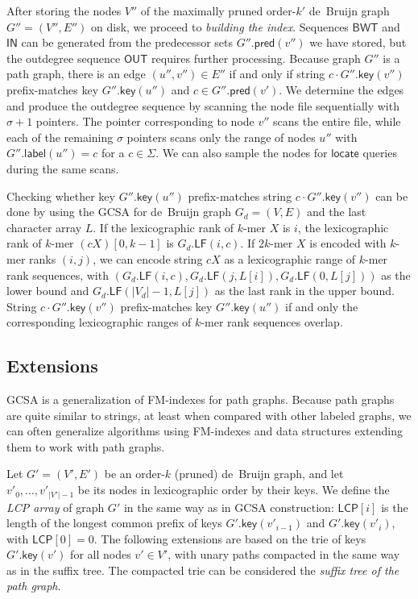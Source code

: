 \documentclass[a4paper,UKenglish]{lipics-v2016}
\newcommand{\abs}[1]{\ensuremath{\lvert #1 \rvert}}
\newcommand{\LF}{\ensuremath{\mathsf{LF}}}
\newcommand{\locate}{\ensuremath{\mathsf{locate}}}
\newcommand{\glabel}{\ensuremath{\mathsf{label}}}
\newcommand{\gpred}{\ensuremath{\mathsf{pred}}}
\newcommand{\gkey}{\ensuremath{\mathsf{key}}}
\newcommand{\kmer}[1]{$#1$\nobreakdash-mer}
\newcommand{\orderk}[1]{order\nobreakdash-$#1$}
\newcommand{\BWT}{\ensuremath{\mathsf{BWT}}}
\newcommand{\LCP}{\ensuremath{\mathsf{LCP}}}
\newcommand{\bvIN}{\ensuremath{\mathsf{IN}}}
\newcommand{\bvOUT}{\ensuremath{\mathsf{OUT}}}
\begin{document}
After storing the nodes $V''$ of the maximally pruned \orderk{k'} de~Bruijn graph $G'' = (V'', E'')$ on disk, we proceed to \emph{building the index}. Sequences $\BWT$ and $\bvIN$ can be generated from the predecessor sets $G''.\gpred(v'')$ we have stored, but the outdegree sequence $\bvOUT$ requires further processing. Because graph $G''$ is a path graph, there is an edge $(u'', v'') \in E''$ if and only if string $c \cdot G''.\gkey(v'')$ prefix-matches key $G''.\gkey(u'')$ and $c \in G''.\gpred(v')$. We determine the edges and produce the outdegree sequence by scanning the node file sequentially with $\sigma+1$ pointers. The pointer corresponding to node $v''$ scans the entire file, while each of the remaining $\sigma$ pointers scans only the range of nodes $u''$ with $G''.\glabel(u'') = c$ for a $c \in \Sigma$. We can also sample the nodes for $\locate$ queries during the same scans.

Checking whether key $G''.\gkey(u'')$ prefix-matches string $c \cdot G''.\gkey(v'')$ can be done by using the GCSA for de~Bruijn graph $G_{d} = (V, E)$ and the last character array $L$. If the lexicographic rank of \kmer{k} $X$ is $i$, the lexicographic rank of \kmer{k} $(cX)[0, k-1]$ is $G_{d}.\LF(i, c)$. If \kmer{2k} $X$ is encoded with \kmer{k} ranks $(i, j)$, we can encode string $cX$ as a lexicographic range of \kmer{k} rank sequences, with $(G_{d}.\LF(i, c), G_{d}.\LF(j, L[i]), G_{d}.\LF(0, L[j]))$ as the lower bound and $G_{d}.\LF(\abs{V_{d}}-1, L[j])$ as the last rank in the upper bound. String $c \cdot G''.\gkey(v'')$ prefix-matches key $G''.\gkey(u'')$ if and only the corresponding lexicographic ranges of \kmer{k} rank sequences overlap.

\subsection{Extensions}

GCSA is a generalization of FM\nobreakdash-indexes for path graphs. Because path graphs are quite similar to strings, at least when compared with other labeled graphs, we can often generalize algorithms using FM\nobreakdash-indexes and data structures extending them to work with path graphs.

Let $G' = (V', E')$ be an \orderk{k} (pruned) de~Bruijn graph, and let $v'_{0}, \dotsc, v'_{\abs{V'}-1}$ be its nodes in lexicographic order by their keys. We define the \emph{LCP array} of graph $G'$ in the same way as in GCSA construction: $\LCP[i]$ is the length of the longest common prefix of keys $G'.\gkey(v'_{i-1})$ and $G'.\gkey(v'_{i})$, with $\LCP[0] = 0$. The following extensions are based on the trie of keys $G'.\gkey(v')$ for all nodes $v' \in V'$, with unary paths compacted in the same way as in the suffix tree. The compacted trie can be considered the \emph{suffix tree of the path graph}.
\end{document}
